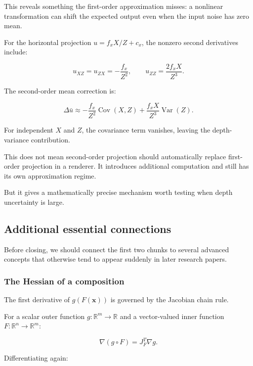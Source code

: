 This reveals something the first-order approximation misses: a nonlinear transformation can shift the expected output even when the input noise has zero mean.

For the horizontal projection \(u=f_xX/Z+c_x\), the nonzero second derivatives include:

\[
u_{XZ}=u_{ZX}=-\frac{f_x}{Z^2}, \qquad u_{ZZ}=\frac{2f_xX}{Z^3}.
\]

The second-order mean correction is:

\[
\boxed{ \Delta\bar u \approx -\frac{f_x}{Z^2}\operatorname{Cov}(X,Z) + \frac{f_xX}{Z^3}\operatorname{Var}(Z) }.
\]

For independent \(X\) and \(Z\), the covariance term vanishes, leaving the depth-variance contribution.

This does not mean second-order projection should automatically replace first-order projection in a renderer. It introduces additional computation and still has its own approximation regime.

But it gives a mathematically precise mechanism worth testing when depth uncertainty is large.

\subsection{Additional essential connections}\label{02-foundations-ii-ch021-additional-essential-connections}

\hypertarget{02-foundations-ii-ch021-additional-essential-connections}{}

Before closing, we should connect the first two chunks to several advanced concepts that otherwise tend to appear suddenly in later research papers.

\subsubsection{The Hessian of a composition}\label{02-foundations-ii-ch021-the-hessian-of-a-composition}

\hypertarget{02-foundations-ii-ch021-the-hessian-of-a-composition}{}

The first derivative of \(g(F(\mathbf x))\) is governed by the Jacobian chain rule.

For a scalar outer function \(g:\mathbb R^m\to\mathbb R\) and a vector-valued inner function \(F:\mathbb R^n\to\mathbb R^m\):

\[
\nabla(g\circ F)=J_F^T\nabla g.
\]

Differentiating again:

